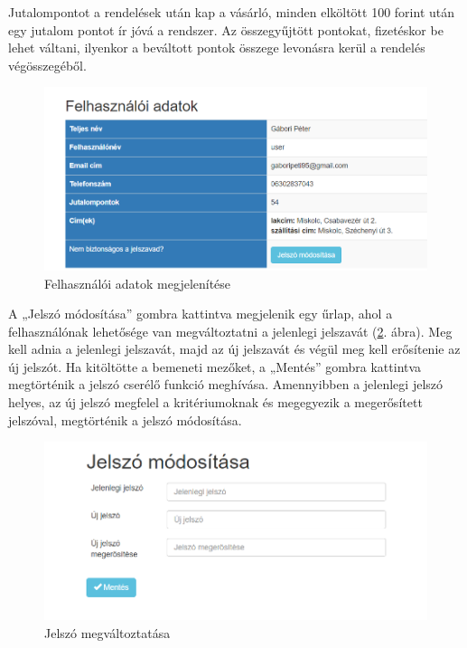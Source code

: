 Jutalompontot a rendelések után kap a vásárló, minden elköltött 100 forint után egy jutalom pontot ír jóvá a rendszer. Az összegyűjtött pontokat, fizetéskor be lehet váltani, ilyenkor a beváltott pontok összege levonásra kerül a rendelés végösszegéből.

\begin{figure}
\centering
\includegraphics[scale=0.6]{kepek/profile.png}
\caption{Felhasználói adatok megjelenítése}
\label{fig:profile}
\end{figure}

A „Jelszó módosítása” gombra kattintva megjelenik egy űrlap, ahol a felhasználónak lehetősége van megváltoztatni a jelenlegi jelszavát (\ref{fig:password}. ábra). Meg kell adnia a jelenlegi jelszavát, majd az új jelszavát és végül meg kell erősítenie az új jelszót. Ha kitöltötte a bemeneti mezőket, a „Mentés” gombra kattintva megtörténik a jelszó cserélő funkció meghívása. Amennyibben a jelenlegi jelszó helyes, az új jelszó megfelel a kritériumoknak és megegyezik a megerősített jelszóval, megtörténik a jelszó módosítása.

\begin{figure}
\centering
\includegraphics[scale=0.8]{kepek/password.png}
\caption{Jelszó megváltoztatása}
\label{fig:password}
\end{figure}

